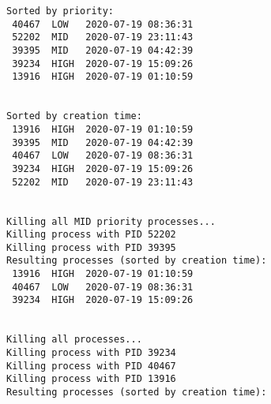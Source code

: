 \documentclass[a4paper]{scrartcl}
\begin{document}
\begin{verbatim}
Sorted by priority:
 40467  LOW   2020-07-19 08:36:31
 52202  MID   2020-07-19 23:11:43
 39395  MID   2020-07-19 04:42:39
 39234  HIGH  2020-07-19 15:09:26
 13916  HIGH  2020-07-19 01:10:59


Sorted by creation time:
 13916  HIGH  2020-07-19 01:10:59
 39395  MID   2020-07-19 04:42:39
 40467  LOW   2020-07-19 08:36:31
 39234  HIGH  2020-07-19 15:09:26
 52202  MID   2020-07-19 23:11:43


Killing all MID priority processes...
Killing process with PID 52202
Killing process with PID 39395
Resulting processes (sorted by creation time):
 13916  HIGH  2020-07-19 01:10:59
 40467  LOW   2020-07-19 08:36:31
 39234  HIGH  2020-07-19 15:09:26


Killing all processes...
Killing process with PID 39234
Killing process with PID 40467
Killing process with PID 13916
Resulting processes (sorted by creation time):
\end{verbatim}
\end{document}
